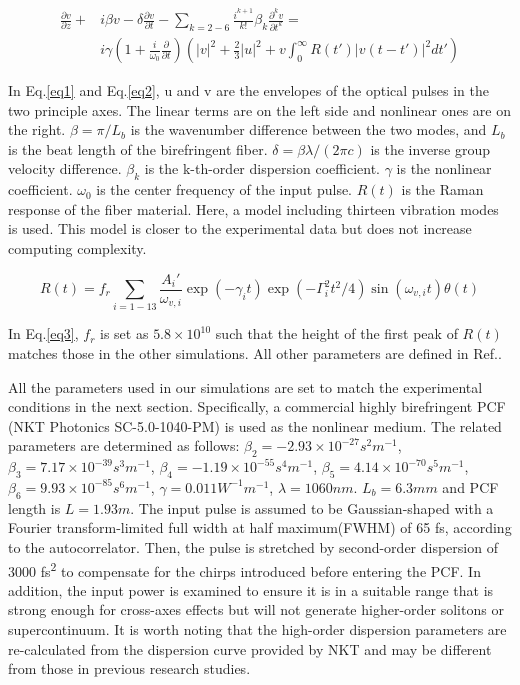 \documentclass{osa-article}
\begin{document}
\begin{equation}
\begin{split}
\frac{\partial v}{\partial z} + & i\beta v - \delta \frac{\partial v}{\partial t}-\sum_{k=2-6}\frac{i^{k+1}}{k!}\beta_k\frac{\partial^k v}{\partial t^k} =\\
 & i\gamma\left(1+\frac{i}{\omega_0}\frac{\partial}{\partial t}\right)\left(|v|^2+\frac{2}{3}|u|^2+v\int_0^\infty{R(t')|v(t-t')|^2dt'} \right)
\label{eq2}
\end{split}
\end{equation}

In Eq.\ref{eq1} and Eq.\ref{eq2}, u and v are the envelopes of the optical pulses in the two principle axes. The linear terms are on the left side and nonlinear ones are on the right. $\beta=\pi/L_b$ is the wavenumber difference between the two modes, and $L_b$ is the beat length of the birefringent fiber. $\delta=\beta \lambda/(2\pi c)$ is the inverse group velocity difference. $\beta_k$ is the k-th-order dispersion coefficient. $\gamma$ is the nonlinear coefficient. $\omega_0$ is the center frequency of the input pulse. $R(t)$ is the Raman response of the fiber material. Here, a model including thirteen vibration modes is used\cite{Hollenbeck2002}. This model is closer to the experimental data but does not increase computing complexity.

\begin{equation}
    R(t)=f_r\sum_{i=1-13}\frac{A_i '}{\omega_{v,i}}\exp(-\gamma_i t)\exp(-\Gamma_i^2t^2/4)\sin(\omega_{v,i}t)\theta(t)
    \label{eq3}
\end{equation}

In Eq.\ref{eq3}, $f_r$ is set as $5.8\times 10^{10}$ such that the height of the first peak of $R(t)$ matches those in the other simulations\cite{agrawal_nonlinear_2013}. All other parameters are defined in Ref.\cite{Hollenbeck2002}.

All the parameters used in our simulations are set to match the experimental conditions in the next section. Specifically, a commercial highly birefringent PCF (NKT Photonics SC-5.0-1040-PM) is used as the nonlinear medium. The related parameters are determined as follows: $\beta_2=-2.93\times 10^{-27} s^2m^{-1}$, $\beta_3=7.17\times 10^{-39} s^3m^{-1}$, $\beta_4=-1.19\times 10^{-55} s^4m^{-1}$, $\beta_5=4.14\times 10^{-70} s^5m^{-1}$, $\beta_6=9.93\times 10^{-85} s^6m^{-1}$, $\gamma=0.011 W^{-1}m^{-1}$, $\lambda=1060 nm$. $L_b=6.3 mm$ and PCF length is $ L=1.93m$. The input pulse is assumed to be Gaussian-shaped with a Fourier transform-limited full width at half maximum(FWHM) of 65 fs, according to the autocorrelator. Then, the pulse is stretched by second-order dispersion of 3000 fs\textsuperscript{2} to compensate for the chirps introduced before entering the PCF. In addition, the input power is examined to ensure it is in a suitable range that is strong enough for cross-axes effects but will not generate higher-order solitons or supercontinuum. It is worth noting that the high-order dispersion parameters are re-calculated from the dispersion curve provided by NKT and may be different from those in previous research studies\cite{chen_dual-soliton_2016}.
\end{document}
